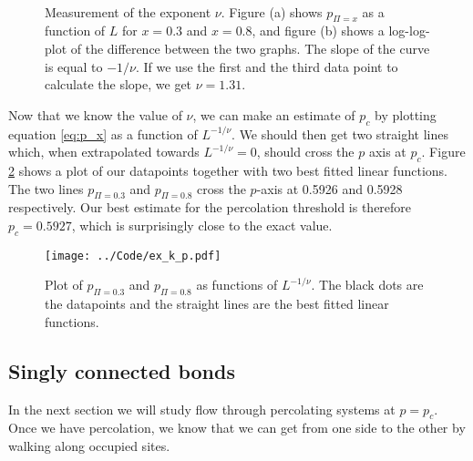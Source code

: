 \documentclass[12pt]{article}
\begin{document}
\begin{figure}[!ht]
    \begin{center}
        \hspace{5mm}
        \\ 
    \end{center}
    \caption{Measurement of the exponent $\nu$. Figure (a) shows $p_{\Pi=x}$ as a function of $L$ for $x=0.3$ and $x=0.8$, and figure (b) shows a log-log-plot of the difference between the two graphs.
	     The slope of the curve is equal to $-1/\nu$.
             If we use the first and the third data point to calculate the slope, we get $\nu = 1.31$.}
    \label{fig:ex_i}
\end{figure}

Now that we know the value of $\nu$, we can make an estimate of $p_c$ by plotting equation \ref{eq:p_x} as a function of $L^{-1/\nu}$. We should then get two straight lines which, when extrapolated towards
$L^{-1/\nu}=0$, should cross the $p$ axis at $p_c$. Figure \ref{fig:ex_k_p} shows a plot of our datapoints together with two best fitted linear functions. The two lines $p_{\Pi=0.3}$ and $p_{\Pi=0.8}$ cross the $p$-axis
at 0.5926 and 0.5928 respectively. Our best estimate for the percolation threshold is therefore $p_c=0.5927$, which is surprisingly close to the exact value.


\begin{figure}[!ht]
    \begin{center}
	\texttt{[image: ../Code/ex\_k\_p.pdf]}
	\caption{Plot of $p_{\Pi=0.3}$ and $p_{\Pi=0.8}$ as functions of $L^{-1/\nu}$. The black dots are the datapoints and the straight lines are the best fitted linear functions.}
	\label{fig:ex_k_p}
    \end{center}
\end{figure}





\subsection*{Singly connected bonds}
In the next section we will study flow through percolating systems at $p=p_c$. Once we have percolation, we know that we can get from one side to the other by walking along occupied sites.
\end{document}
